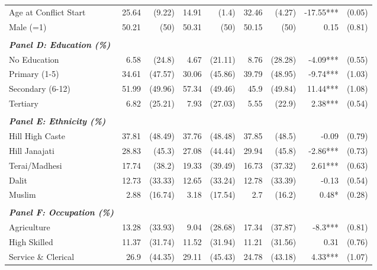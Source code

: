 \begin{landscape}
\begin{table}[!h]
{\begin{tabular}[t]{lrrrrrrrr}
Age at Conflict Start & 25.64 & (9.22) & 14.91 & (1.4) & 32.46 & (4.27) & -17.55*** & (0.05)\\
\addlinespace
Male (=1) & 50.21 & (50) & 50.31 & (50) & 50.15 & (50) & 0.15 & (0.81)\\
 &  &  &  &  &  &  &  & \\
\em{\textbf{Panel D: Education (\%)}} & \em{\textbf{}} & \em{\textbf{}} & \em{\textbf{}} & \em{\textbf{}} & \em{\textbf{}} & \em{\textbf{}} & \em{\textbf{}} & \em{\textbf{}}\\
No Education & 6.58 & (24.8) & 4.67 & (21.11) & 8.76 & (28.28) & -4.09*** & (0.55)\\
Primary (1-5) & 34.61 & (47.57) & 30.06 & (45.86) & 39.79 & (48.95) & -9.74*** & (1.03)\\
\addlinespace
Secondary (6-12) & 51.99 & (49.96) & 57.34 & (49.46) & 45.9 & (49.84) & 11.44*** & (1.08)\\
Tertiary & 6.82 & (25.21) & 7.93 & (27.03) & 5.55 & (22.9) & 2.38*** & (0.54)\\
 &  &  &  &  &  &  &  & \\
\em{\textbf{Panel E: Ethnicity (\%)}} & \em{\textbf{}} & \em{\textbf{}} & \em{\textbf{}} & \em{\textbf{}} & \em{\textbf{}} & \em{\textbf{}} & \em{\textbf{}} & \em{\textbf{}}\\
Hill High Caste & 37.81 & (48.49) & 37.76 & (48.48) & 37.85 & (48.5) & -0.09 & (0.79)\\
\addlinespace
Hill Janajati & 28.83 & (45.3) & 27.08 & (44.44) & 29.94 & (45.8) & -2.86*** & (0.73)\\
Terai/Madhesi & 17.74 & (38.2) & 19.33 & (39.49) & 16.73 & (37.32) & 2.61*** & (0.63)\\
Dalit & 12.73 & (33.33) & 12.65 & (33.24) & 12.78 & (33.39) & -0.13 & (0.54)\\
Muslim & 2.88 & (16.74) & 3.18 & (17.54) & 2.7 & (16.2) & 0.48* & (0.28)\\
 &  &  &  &  &  &  &  & \\
\addlinespace
\em{\textbf{Panel F: Occupation (\%)}} & \em{\textbf{}} & \em{\textbf{}} & \em{\textbf{}} & \em{\textbf{}} & \em{\textbf{}} & \em{\textbf{}} & \em{\textbf{}} & \em{\textbf{}}\\
Agriculture & 13.28 & (33.93) & 9.04 & (28.68) & 17.34 & (37.87) & -8.3*** & (0.81)\\
High Skilled & 11.37 & (31.74) & 11.52 & (31.94) & 11.21 & (31.56) & 0.31 & (0.76)\\
Service \& Clerical & 26.9 & (44.35) & 29.11 & (45.43) & 24.78 & (43.18) & 4.33*** & (1.07)\\

\end{tabular}}
\end{table}
\end{landscape}
